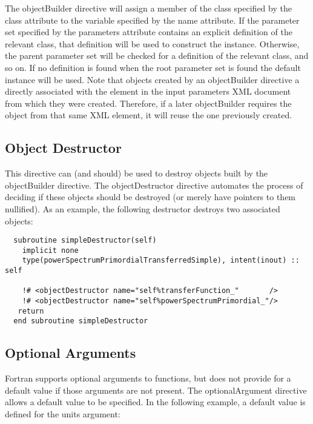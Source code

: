 The {\normalfont \ttfamily objectBuilder} directive will assign a member of the class specified by the {\normalfont \ttfamily class} attribute to the variable specified by the {\normalfont \ttfamily name} attribute. If the parameter set specified by the {\normalfont \ttfamily parameters} attribute contains an explicit definition of the relevant class, that definition will be used to construct the instance. Otherwise, the parent parameter set will be checked for a definition of the relevant class, and so on. If no definition is found when the root parameter set is found the default instance will be used. Note that objects created by an {\normalfont \ttfamily objectBuilder} directive a directly associated with the element in the input parameters XML document from which they were created. Therefore, if a later {\normalfont \ttfamily objectBuilder} requires the object from that same XML element, it will reuse the one previously created.

\subsection{Object Destructor}

This directive can (and should) be used to destroy objects built by the {\normalfont \ttfamily objectBuilder} directive. The {\normalfont \ttfamily objectDestructor} directive automates the process of deciding if these objects should be destroyed (or merely have pointers to them nullified). As an example, the following destructor destroys two associated objects:
\begin{lstlisting}  
  subroutine simpleDestructor(self)
    implicit none
    type(powerSpectrumPrimordialTransferredSimple), intent(inout) :: self

    !# <objectDestructor name="self%transferFunction_"       />
    !# <objectDestructor name="self%powerSpectrumPrimordial_"/>
   return
  end subroutine simpleDestructor
\end{lstlisting}

\subsection{Optional Arguments}

Fortran supports optional arguments to functions, but does not provide for a default value if those arguments are not present. The {\normalfont \ttfamily optionalArgument} directive allows a default value to be specified. In the following example, a default value is defined for the {\normalfont \ttfamily units} argument:

